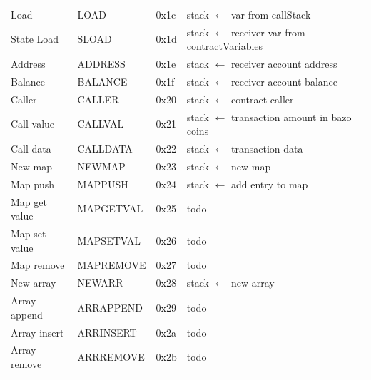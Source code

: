 \begin{table}[]
\begin{tabular}{@{}llll@{}}
Load                 & LOAD              & 0x1c            & stack $\leftarrow$ var from callStack
    \\
State Load           & SLOAD             & 0x1d            & stack $\leftarrow$ receiver var from contractVariables \\
Address              & ADDRESS           & 0x1e            & stack $\leftarrow$ receiver account address                         \\
Balance              & BALANCE           & 0x1f            & stack $\leftarrow$ receiver account balance                         \\
Caller               & CALLER            & 0x20            & stack $\leftarrow$ contract caller                                  \\
Call value           & CALLVAL           & 0x21            & stack $\leftarrow$ transaction amount in bazo coins                 \\
Call data            & CALLDATA          & 0x22            & stack $\leftarrow$ transaction data                                 \\
New map              & NEWMAP            & 0x23            & stack $\leftarrow$ new map                                          \\
Map push             & MAPPUSH           & 0x24            & stack $\leftarrow$ add entry to map                                 \\
Map get value        & MAPGETVAL         & 0x25            & todo                                                     \\
Map set value        & MAPSETVAL         & 0x26            & todo                                                     \\
Map remove           & MAPREMOVE         & 0x27            & todo                                                     \\
New array            & NEWARR            & 0x28            & stack $\leftarrow$ new array                                        \\
Array append         & ARRAPPEND         & 0x29            & todo                                                     \\
Array insert         & ARRINSERT         & 0x2a            & todo                                                     \\
Array remove         & ARRREMOVE         & 0x2b            & todo                                                     \\

\end{tabular}
\end{table}
